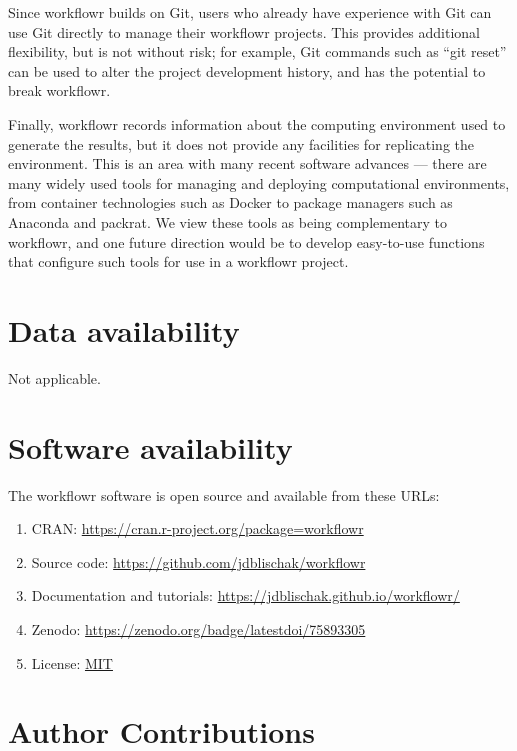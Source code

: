 \documentclass[9pt,a4paper]{extarticle}
\begin{document}
Since workflowr builds on Git, users who already have experience with
Git can use Git directly to manage their workflowr projects. This
provides additional flexibility, but is not without risk; for example,
Git commands such as “git reset” can be used to alter the project
development history, and has the potential to break workflowr.

Finally, workflowr records information about the computing environment
used to generate the results, but it does not provide any facilities for
replicating the environment. This is an area with many recent software
advances --- there are many widely used tools for managing and deploying
computational environments, from container technologies such as Docker
to package managers such as Anaconda and packrat. We view these tools as
being complementary to workflowr, and one future direction would be to
develop easy-to-use functions that configure such tools for use in a
workflowr project.


\section*{Data availability}

Not applicable.


\section*{Software availability}

The workflowr software is open source and available from these URLs:

\begin{enumerate}

\item CRAN: \url{https://cran.r-project.org/package=workflowr}

\item Source code: \url{https://github.com/jdblischak/workflowr}

\item Documentation and tutorials:
\url{https://jdblischak.github.io/workflowr/}

\item Zenodo: \url{https://zenodo.org/badge/latestdoi/75893305}

\item License: \href{https://choosealicense.com/licenses/mit}{MIT}

\end{enumerate}


\section*{Author Contributions}
\end{document}
